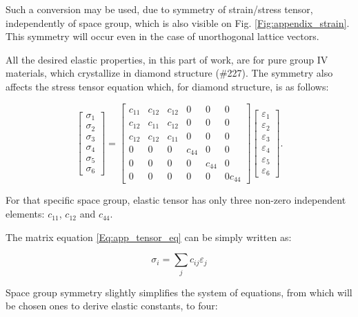 Such a conversion may be used, due to symmetry of strain/stress tensor, independently of space group, which is also visible on Fig. \ref{Fig:appendix_strain}. This symmetry will occur even in the case of unorthogonal lattice vectors.

All the desired elastic properties, in this part of work, are for pure group IV materials, which crystallize in diamond structure (\#227).
The symmetry also affects the stress tensor equation which, for diamond structure, is as follows:

\begin{equation}
\label{Eq:app_tensor_eq}
\begin{bmatrix}
\sigma_1 \\ \sigma_2 \\ \sigma_3 \\ \sigma_4 \\ \sigma_5 \\ \sigma_6
\end{bmatrix}=
\begin{bmatrix}
c_{11} & c_{12} & c_{12} & 0 & 0 & 0 \\
c_{12} & c_{11} & c_{12} & 0 & 0 & 0 \\
c_{12} & c_{12} & c_{11} & 0 & 0 & 0 \\
0 & 0 & 0 & c_{44} & 0 & 0 \\
0 & 0 & 0 & 0 & c_{44} & 0 \\
0 & 0 & 0 & 0 & 0 & 0c_{44} 
\end{bmatrix}
\begin{bmatrix}
\varepsilon_1 \\ \varepsilon_2 \\ \varepsilon_3 \\ \varepsilon_4 \\ \varepsilon_5 \\ \varepsilon_6
\end{bmatrix}.
\end{equation}

For that specific space group, elastic tensor has only three non-zero independent elements: $c_{11}$, $c_{12}$ and $c_{44}$.

The matrix equation \ref{Eq:app_tensor_eq} can be simply written as:

\begin{equation}
    \label{Eq:tensor_element}
    \sigma_i=\sum_jc_{ij}\varepsilon_j
\end{equation}

Space group symmetry slightly simplifies the system of equations, from which will be chosen ones to derive elastic constants, to four:

